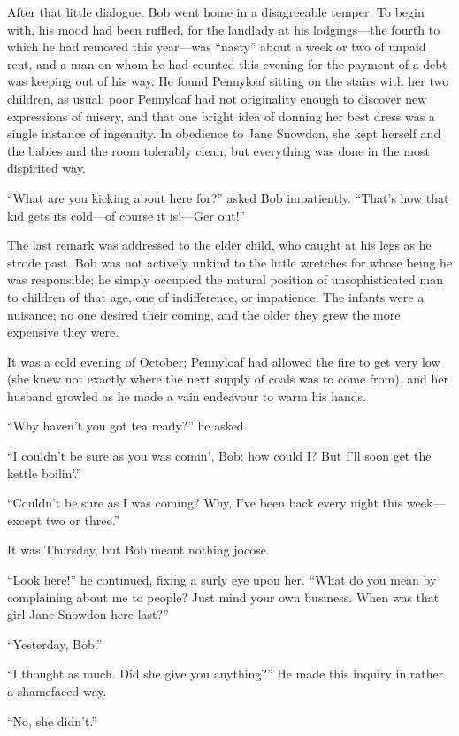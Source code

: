 After that little dialogue. Bob went home in a disagreeable temper. To
begin with, his mood had been ruffled, for the landlady at his
lodgings---the fourth to which he had removed this year---was ``nasty''
about a week or two of unpaid rent, and a man on whom he had counted
this evening for the payment of a debt was keeping out of his way. He
found Pennyloaf sitting on the stairs with her two children, as usual;
poor Pennyloaf had not originality enough to discover new expressions of
misery, and that one bright idea of donning her best dress was a single
instance of ingenuity. In obedience to Jane Snowdon, she kept herself
and the babies and the room tolerably clean, but everything was done in
the most dispirited way.

``What are you kicking about here for?'' asked Bob impatiently. ``That's
how that kid gets its cold---of course it is!---{Ger} out!''

{}The last remark was addressed to the elder child, who caught at his
legs as he strode past. Bob was not actively unkind to the little
wretches for whose being he was responsible; he simply occupied the
natural position of unsophisticated man to children of that age, one of
indifference, or impatience. The infants were a nuisance; no one desired
their coming, and the older they grew the more expensive they were.

It was a cold evening of October; Pennyloaf had allowed the fire to get
very low (she knew not exactly where the next supply of coals was to
come from), and her husband growled as he made a vain endeavour to warm
his hands.

``Why haven't you got tea ready?'' he asked.

``I couldn't be sure as you was comin', Bob; how could I? But I'll soon
get the kettle boilin'.''

``Couldn't be sure as I was coming? Why, I've been back every night this
week---except two or three.''

{}It was Thursday, but Bob meant nothing jocose.

``Look here!'' he continued, fixing a surly eye upon her. ``What do you
mean by complaining about me to people? Just mind your own business.
When was that girl Jane Snowdon here last?''

``Yesterday, Bob.''

``I thought as much. Did she give you anything?'' He made this inquiry
in rather a shamefaced way.

``No, she didn't.''

